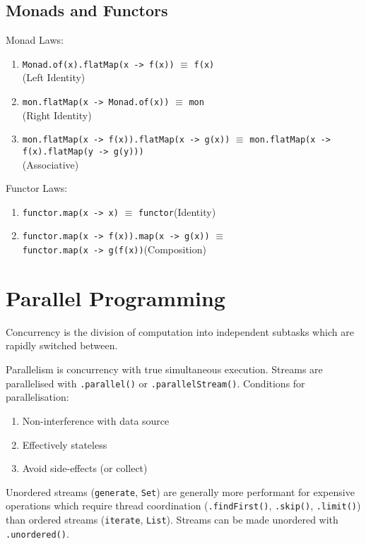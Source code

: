 \documentclass[12pt, a4paper]{article}
\begin{document}
\begin{multicols*}{3}
\subsection{Monads and Functors}
Monad Laws:
\begin{enumerate}[\roman*.]
  \item \lstinline|Monad.of(x).flatMap(x -> f(x))| $\equiv$ \lstinline|f(x)|\\\hfill(Left Identity)
  \item \lstinline|mon.flatMap(x -> Monad.of(x))| $\equiv$ \lstinline|mon|\\\hfill(Right Identity)
  \item \lstinline|mon.flatMap(x -> f(x)).flatMap(x -> g(x))| $\equiv$ \lstinline|mon.flatMap(x -> f(x).flatMap(y -> g(y)))|\\\hfill(Associative)
\end{enumerate}

Functor Laws:
\begin{enumerate}[\roman*.]
  \item \lstinline|functor.map(x -> x)| $\equiv$ \lstinline|functor|\hfill(Identity)
  \item \lstinline|functor.map(x -> f(x)).map(x -> g(x))| $\equiv$\\ \lstinline|functor.map(x -> g(f(x))|\hfill(Composition)
\end{enumerate}

\section{Parallel Programming}
Concurrency is the division of computation into independent subtasks which are rapidly switched between.

Parallelism is concurrency with true simultaneous execution. Streams are parallelised with \lstinline|.parallel()| or \lstinline|.parallelStream()|. Conditions for parallelisation:
\begin{enumerate}[\roman*.]
  \item Non-interference with data source
  \item Effectively stateless
  \item Avoid side-effects (or collect)
\end{enumerate}

Unordered streams (\lstinline|generate|, \lstinline|Set|) are generally more performant for expensive operations which require thread coordination (\lstinline|.findFirst()|, \lstinline|.skip()|, \lstinline|.limit()|) than ordered streams (\lstinline|iterate|, \lstinline|List|). Streams can be made unordered with \lstinline|.unordered()|.


\end{multicols*}
\end{document}
